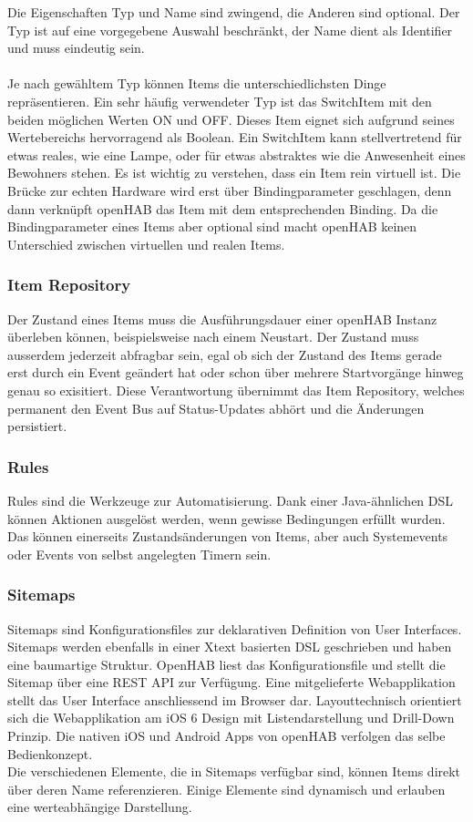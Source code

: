 Die Eigenschaften Typ und Name sind zwingend, die Anderen sind optional. Der Typ ist auf eine vorgegebene Auswahl beschränkt, der Name dient als Identifier und muss eindeutig sein.\\
\\
Je nach gewähltem Typ können Items die unterschiedlichsten Dinge repräsentieren. Ein sehr häufig verwendeter Typ ist das SwitchItem mit den beiden möglichen Werten ON und OFF. Dieses Item eignet sich aufgrund seines Wertebereichs hervorragend als Boolean. Ein SwitchItem kann stellvertretend für etwas reales, wie eine Lampe, oder für etwas abstraktes wie die Anwesenheit eines Bewohners stehen. Es ist wichtig zu verstehen, dass ein Item rein virtuell ist. Die Brücke zur echten Hardware wird erst über Bindingparameter geschlagen, denn dann verknüpft openHAB das Item mit dem entsprechenden Binding. Da die Bindingparameter eines Items aber optional sind macht openHAB keinen Unterschied zwischen virtuellen und realen Items.


\subsubsection{Item Repository}
Der Zustand eines Items muss die Ausführungsdauer einer openHAB Instanz überleben können, beispielsweise nach einem Neustart. Der Zustand muss ausserdem jederzeit abfragbar sein, egal ob sich der Zustand des Items gerade erst durch ein Event geändert hat oder schon über mehrere Startvorgänge hinweg genau so exisitiert. Diese Verantwortung übernimmt das Item Repository, welches permanent den Event Bus auf Status-Updates abhört und die Änderungen persistiert.

\subsubsection{Rules}
Rules sind die Werkzeuge zur Automatisierung. Dank einer Java-ähnlichen DSL können Aktionen ausgelöst werden, wenn gewisse Bedingungen erfüllt wurden. Das können einerseits Zustandsänderungen von Items, aber auch Systemevents oder Events von selbst angelegten Timern sein. 

\subsubsection{Sitemaps}
Sitemaps sind Konfigurationsfiles zur deklarativen Definition von User Interfaces. Sitemaps werden ebenfalls in einer Xtext basierten DSL geschrieben und haben eine baumartige Struktur. OpenHAB liest das Konfigurationsfile und stellt die Sitemap über eine REST API zur Verfügung. Eine mitgelieferte Webapplikation stellt das User Interface anschliessend im Browser dar. Layouttechnisch orientiert sich die Webapplikation am iOS 6 Design mit Listendarstellung und Drill-Down Prinzip. Die nativen iOS und Android Apps von openHAB verfolgen das selbe Bedienkonzept.\\
Die verschiedenen Elemente, die in Sitemaps verfügbar sind, können Items direkt über deren Name referenzieren. Einige Elemente sind dynamisch und erlauben eine werteabhängige Darstellung.

